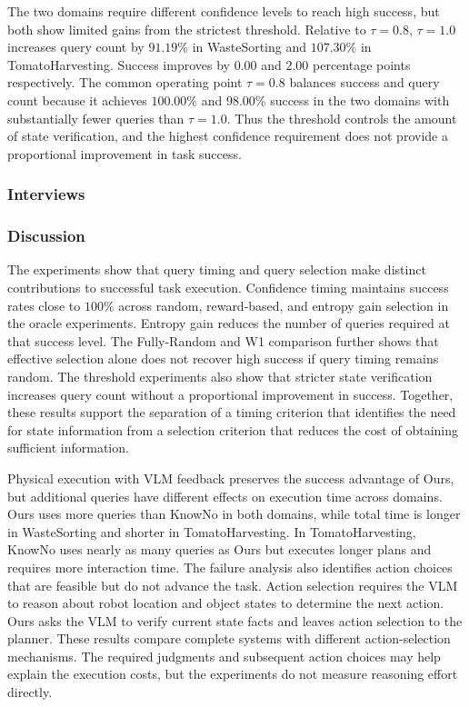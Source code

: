 The two domains require different confidence levels to reach high success, but both show limited gains from the strictest threshold. Relative to $\tau=0.8$, $\tau=1.0$ increases query count by $91.19\%$ in WasteSorting and $107.30\%$ in TomatoHarvesting. Success improves by $0.00$ and $2.00$ percentage points respectively. The common operating point $\tau=0.8$ balances success and query count because it achieves $100.00\%$ and $98.00\%$ success in the two domains with substantially fewer queries than $\tau=1.0$. Thus the threshold controls the amount of state verification, and the highest confidence requirement does not provide a proportional improvement in task success.

\subsubsection*{Interviews}\label{exp:interviews}


\subsubsection*{Discussion}\label{exp:discussion}

The experiments show that query timing and query selection make distinct contributions to successful task execution. Confidence timing maintains success rates close to $100\%$ across random, reward-based, and entropy gain selection in the oracle experiments. Entropy gain reduces the number of queries required at that success level. The Fully-Random and W1 comparison further shows that effective selection alone does not recover high success if query timing remains random. The threshold experiments also show that stricter state verification increases query count without a proportional improvement in success. Together, these results support the separation of a timing criterion that identifies the need for state information from a selection criterion that reduces the cost of obtaining sufficient information.

Physical execution with VLM feedback preserves the success advantage of Ours, but additional queries have different effects on execution time across domains. Ours uses more queries than KnowNo in both domains, while total time is longer in WasteSorting and shorter in TomatoHarvesting. In TomatoHarvesting, KnowNo uses nearly as many queries as Ours but executes longer plans and requires more interaction time. The failure analysis also identifies action choices that are feasible but do not advance the task. Action selection requires the VLM to reason about robot location and object states to determine the next action. Ours asks the VLM to verify current state facts and leaves action selection to the planner. These results compare complete systems with different action-selection mechanisms. The required judgments and subsequent action choices may help explain the execution costs, but the experiments do not measure reasoning effort directly.

